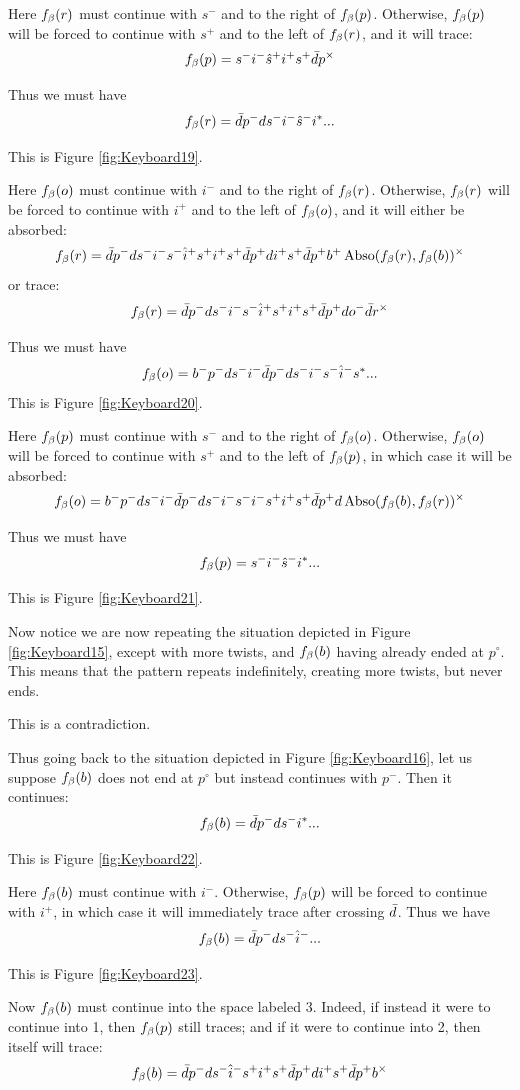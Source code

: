 Here $f_\beta(r)$ must continue with $s^-$ and to the right of $f_\beta(p)$. Otherwise, $f_\beta(p)$ will be forced to continue with $s^+$ and to the left of $f_\beta(r)$, and it will trace:
\[
f_\beta(p)  = s^- i^- \hat{s}^+ i^+ s^+ \bar{d} p^\times
\]

Thus we must have
\[
f_\beta(r) = \bar{d} p^- d s^- i^- \hat{s}^- i^*...
\]

This is Figure \ref{fig:Keyboard19}.

Here $f_\beta(o)$ must continue with $i^-$ and to the right of $f_\beta(r)$. Otherwise, $f_\beta(r)$ will be forced to continue with $i^+$ and to the left of $f_\beta(o)$, and it will either be absorbed:
\[
f_\beta(r) = \bar{d} p^- d s^- i^- s^- \hat{i}^+ s^+ i^+ s^+ \bar{d} p^+ d i^+ s^+ \bar{d} p^+ b^+ \operatorname{Abso}(f_\beta(r), f_\beta(b))^\times
\]
or trace:
\[
f_\beta(r) = \bar{d} p^- d s^- i^- s^- \hat{i}^+ s^+ i^+ s^+ \bar{d} p^+ d o^- \bar{d} r^\times
\]

Thus we must have
\[
f_\beta(o) = b^- p^- d s^- i^- \bar{d} p^- d s^- i^- s^- \hat{i}^- s^*...
\]
This is Figure \ref{fig:Keyboard20}.

Here $f_\beta(p)$ must continue with $s^-$ and to the right of $f_\beta(o)$. Otherwise, $f_\beta(o)$ will be forced to continue with $s^+$ and to the left of $f_\beta(p)$, in which case it will be absorbed:
\[
f_\beta(o) = b^- p^- d s^- i^- \bar{d} p^- d s^- i^- s^- i^- s^+ i^+ s^+ \bar{d} p^+ d \operatorname{Abso}(f_\beta(b), f_\beta(r))^\times
\]

Thus we must have
\[
f_\beta(p) = s^- i^- \hat{s}^- i^*...
\]

This is Figure \ref{fig:Keyboard21}.

Now notice we are now repeating the situation depicted in Figure \ref{fig:Keyboard15}, except with more twists, and $f_\beta(b)$ having already ended at $p^\circ$. This means that the pattern repeats indefinitely, creating more twists, but never ends.

This is a contradiction.

Thus going back to the situation depicted in Figure \ref{fig:Keyboard16}, let us suppose $f_\beta(b)$ does not end at $p^\circ$ but instead continues with $p^-$. Then it continues:
\[
f_\beta(b) = \bar{d} p^- d s^- i^*...
\]

This is Figure \ref{fig:Keyboard22}.

Here $f_\beta(b)$ must continue with $i^-$. Otherwise, $f_\beta(p)$ will be forced to continue with $i^+$, in which case it will immediately trace after crossing $\bar{d}$. Thus we have
\[
f_\beta(b) = \bar{d} p^- d s^- \hat{i}^-...
\]

This is Figure \ref{fig:Keyboard23}.

Now $f_\beta(b)$ must continue into the space labeled 3. Indeed, if instead it were to continue into 1, then $f_\beta(p)$ still traces; and if it were to continue into 2, then itself will trace:
\[
f_\beta(b) = \bar{d} p^- d s^- \hat{i}^- s^+ i^+ s^+ \bar{d} p^+ d i^+ s^+ \bar{d} p^+ b^\times
\]

